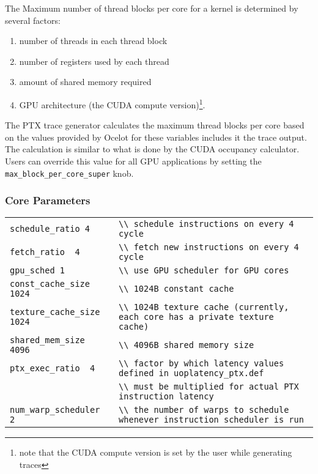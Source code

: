 The Maximum number of thread blocks per core for a kernel is determined by
several factors: 
\begin{enumerate}
 \item number of threads in each thread block
 \item number of registers used by each thread
 \item amount of shared memory required
 \item GPU architecture (the CUDA compute version)\footnote{note that the CUDA 
 compute version is set by the user while generating traces}.
\end{enumerate}
\noindent The PTX trace generator calculates the maximum thread blocks per core based on the 
values provided by Ocelot for these variables includes it the trace output. The
calculation is similar to what is done by the CUDA occupancy calculator. Users
can override this value for all GPU applications by setting the
\Verb+max_block_per_core_super+ knob.

\subsubsection{\gpu Core Parameters}

\begin{tabular}{l l}
 \Verb+schedule_ratio 4+ & \Verb+\\ schedule instructions on every 4 cycle+ \\
 \Verb+fetch_ratio  4+ & \Verb+\\ fetch new instructions on every 4 cycle+ \\
 \Verb+gpu_sched 1+ & \Verb+\\ use GPU scheduler for GPU cores+ \\ %
 \Verb+const_cache_size  1024+ & \Verb+\\ 1024B constant cache+ \\
 \Verb+texture_cache_size 1024+ & \Verb+\\ 1024B texture cache (currently, each core has a private texture cache)+ \\
 \Verb+shared_mem_size 4096+ & \Verb+\\ 4096B shared memory size + \\
 \Verb+ptx_exec_ratio  4+ & \Verb+\\ factor by which latency values defined in uoplatency_ptx.def+ \\
 \Verb++			     & \Verb+\\ must be multiplied for actual PTX instruction latency+ \\
 \Verb+num_warp_scheduler 2+ & \Verb+\\ the number of warps to schedule whenever instruction scheduler is run+
\end{tabular}

